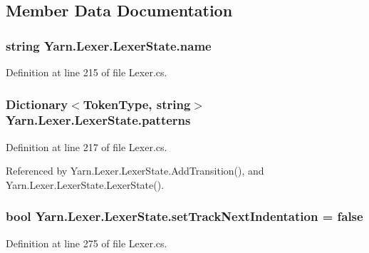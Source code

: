 \subsection{Member Data Documentation}
\hypertarget{a00118_aeb8debd0d81a76e90f083f0bf407573e}{
\subsubsection[{name}]{\setlength{\rightskip}{0pt plus 5cm}string Yarn.\-Lexer.\-Lexer\-State.\-name}}\label{a00118_aeb8debd0d81a76e90f083f0bf407573e}


Definition at line 215 of file Lexer.\-cs.

\hypertarget{a00118_a951f91e9522ffe84851f2e25e9445106}{
\subsubsection[{patterns}]{\setlength{\rightskip}{0pt plus 5cm}Dictionary$<${\bf Token\-Type}, string$>$ Yarn.\-Lexer.\-Lexer\-State.\-patterns\hspace{0.3cm}{\ttfamily [private]}}}\label{a00118_a951f91e9522ffe84851f2e25e9445106}


Definition at line 217 of file Lexer.\-cs.



Referenced by Yarn.\-Lexer.\-Lexer\-State.\-Add\-Transition(), and Yarn.\-Lexer.\-Lexer\-State.\-Lexer\-State().

\hypertarget{a00118_ad8b6ccac53bedd9dc202ffe6ac5698b2}{
\subsubsection[{set\-Track\-Next\-Indentation}]{\setlength{\rightskip}{0pt plus 5cm}bool Yarn.\-Lexer.\-Lexer\-State.\-set\-Track\-Next\-Indentation = false}}\label{a00118_ad8b6ccac53bedd9dc202ffe6ac5698b2}


Definition at line 275 of file Lexer.\-cs.



